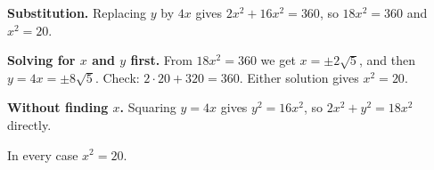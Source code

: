 \textbf{Substitution.} Replacing $y$ by $4x$ gives $2x^2+16x^2=360$, so $18x^2=360$ and $x^2=20$.

\textbf{Solving for $x$ and $y$ first.} From $18x^2=360$ we get $x=\pm2\sqrt5$, and then $y=4x=\pm8\sqrt5$. Check: $2\cdot20+320=360$. Either solution gives $x^2=20$.

\textbf{Without finding $x$.} Squaring $y=4x$ gives $y^2=16x^2$, so $2x^2+y^2=18x^2$ directly.

In every case $\boxed{x^2=20}$.
